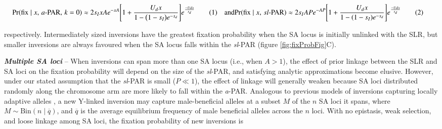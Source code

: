 \documentclass{article}[12pt]
\newcommand\numberthis{\addtocounter{equation}{1}\tag{\theequation}}
\begin{document}
\begin{subequations}\label{eq:SAPfixWithDel}
	\begin{align*}
	\Pr (\text{fix} \mid x,\,a\text{-PAR},\, k=0) &\approx 2 s_I x A e^{-xA} \Bigg[1 + \frac{U_d x}{1 - \big(1 - s_I \big) e^{-s_d}} \Bigg]e^{\frac{-Ud x}{s_d}} \numberthis
	\end{align*}
	\text{and}
	\begin{align*}
	\Pr (\text{fix} \mid x,\,sl\text{-PAR}) &\approx 2 s_I A P e^{-A P} \Bigg[1 + \frac{U_d x}{1 - (1 - s_I) e^{-s_d}} \Bigg]e^{\frac{-Ud x}{s_d}} \numberthis
	\end{align*}
\end{subequations}

\noindent respectively. Intermediately sized inversions have the greatest fixation probability when the SA locus is initially unlinked with the SLR, but smaller inversions are always favoured when the SA locus falls within the {\itshape sl}-PAR (figure \ref{fig:fixProbFig}C). \vspace{12pt}

 \vspace{12pt}

{\bf \itshape Multiple SA loci} -- When inversions can span more than one SA locus (i.e., when $A > 1$), the effect of prior linkage between the SLR and SA loci on the fixation probability will depend on the size of the {\itshape sl}-PAR, and satisfying analytic approximations become elusive. However, under our stated assumption that the {\itshape sl}-PAR is small ($P \ll 1$), the effect of linkage will generally weaken because SA loci distributed randomly along the chromosome arm are more likely to fall within the {\itshape a}-PAR. Analogous to previous models of inversions capturing locally adaptive alleles \citep{KirkpatrickBarton2003, Connallon2018}, a new Y-linked inversion may capture male-beneficial alleles at a subset $M$ of the $n$ SA loci it spans, where $M \sim \text{Bin}(n \mid \overline{q})$, and $\overline{q}$ is the average equilibrium frequency of male beneficial alleles across the $n$ loci. With no epistasis, weak selection, and loose linkage among SA loci, the fixation probability of new inversions is
\end{document}
